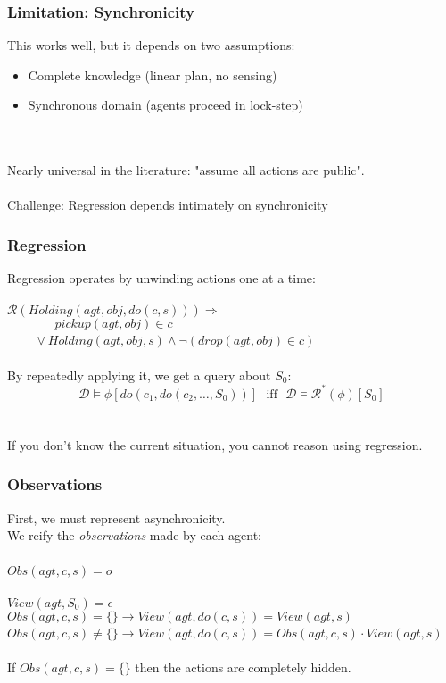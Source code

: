 \documentclass{beamer}
\newcommand{\Dt}{\mathcal{D}}
\newcommand{\Reg}{\mathcal{R}}
\begin{document}
\begin{frame}
\frametitle{Limitation: Synchronicity}
This works well, but it depends on two assumptions:
\begin{itemize}
\item Complete knowledge (linear plan, no sensing)
\item Synchronous domain (agents proceed in lock-step)
\end{itemize}
\pause
\ \\
\ \\
Nearly universal in the literature: "assume all actions are public".
\ \\
\ \\
\alert{Challenge:}  Regression depends intimately on synchronicity

\end{frame}

\begin{frame}
\frametitle{Regression}
Regression operates by unwinding actions one at a time:
\ \\
\ \\
$\Reg(Holding(agt,obj,do(c,s))) \Rightarrow$\\
$\,\,\,\,\,\,\,\,\,\,\,\,\,\,\,\,\,\,\,\,\,\,\,pickup(agt,obj) \in c$ \\
$\,\,\,\,\,\,\,\,\,\,\,\,\,\vee Holding(agt,obj,s) \wedge \neg\left(drop(agt,obj) \in c\right)$
\ \\
\ \\
\pause
By repeatedly applying it, we get a query about $S_0$:
\[
\Dt\models\phi[do(c_1,do(c_2,\dots,S_0))]\,\,\,\,\mathrm{iff}\,\,\,\,\Dt\models\Reg^{*}(\phi)[S_0]
\]
\ \\
\ \\
\pause
If you don't know the current situation, you cannot reason using regression.
\end{frame}

\begin{frame}
\frametitle{Observations}
First, we must represent asynchronicity.\\
We reify the \emph{observations} made by each agent:
\ \\
\ \\
\small
$Obs(agt,c,s) = o$
\ \\
\ \\
\pause
$View(agt,S_0) = \epsilon$\\
$Obs(agt,c,s) = \{\} \rightarrow View(agt,do(c,s)) = View(agt,s)$\\
$Obs(agt,c,s) \neq \{\} \rightarrow View(agt,do(c,s)) = Obs(agt,c,s) \cdot View(agt,s)$
\normalsize
\ \\
\ \\
\pause
If $Obs(agt,c,s)=\{\}$ then the actions are completely hidden.
\end{frame}
\end{document}
